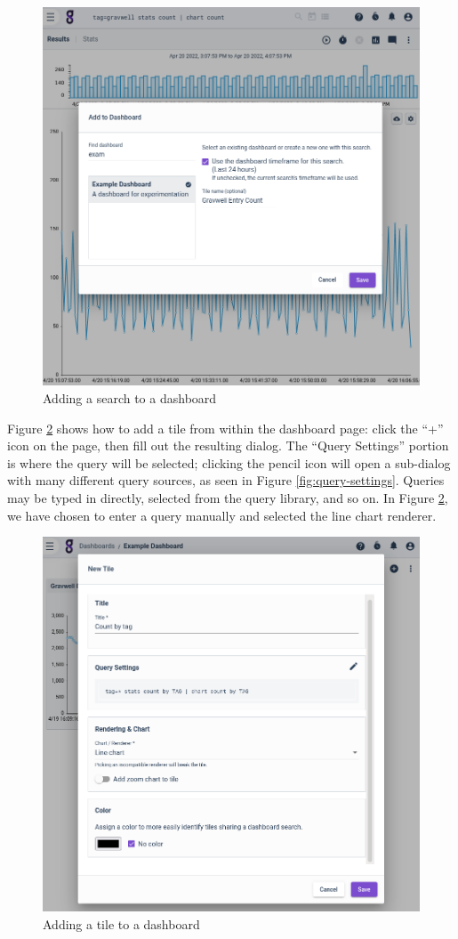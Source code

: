 \begin{figure}
	\includegraphics[width=0.8\linewidth]{images/add-to-dashboard.png}
	\caption{Adding a search to a dashboard}
	\label{fig:add-to-dashboard}
\end{figure}

Figure \ref{fig:add-in-dashboard} shows how to add a tile from within the dashboard page: click the ``+'' icon on the page, then fill out the resulting dialog. The ``Query Settings'' portion is where the query will be selected; clicking the pencil icon will open a sub-dialog with many different query sources, as seen in Figure \ref{fig:query-settings}. Queries may be typed in directly, selected from the query library, and so on. In Figure \ref{fig:add-in-dashboard}, we have chosen to enter a query manually and selected the line chart renderer.


\begin{figure}
	\includegraphics[width=0.8\linewidth]{images/add-in-dashboard.png}
	\caption{Adding a tile to a dashboard}
	\label{fig:add-in-dashboard}
\end{figure}

